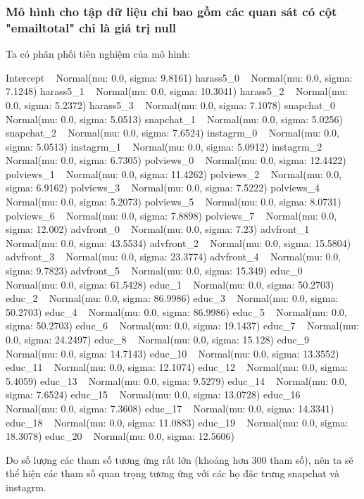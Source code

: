 \subsubsection{Mô hình cho tập dữ liệu chỉ bao gồm các quan sát có cột "emailtotal" chỉ là giá trị null}

Ta có phân phối tiên nghiệm của mô hình:

\begin{python}
Intercept ~ Normal(mu: 0.0, sigma: 9.8161)
harass5_0 ~ Normal(mu: 0.0, sigma: 7.1248)
harass5_1 ~ Normal(mu: 0.0, sigma: 10.3041)
harass5_2 ~ Normal(mu: 0.0, sigma: 5.2372)
harass5_3 ~ Normal(mu: 0.0, sigma: 7.1078)
snapchat_0 ~ Normal(mu: 0.0, sigma: 5.0513)
snapchat_1 ~ Normal(mu: 0.0, sigma: 5.0256)
snapchat_2 ~ Normal(mu: 0.0, sigma: 7.6524)
instagrm_0 ~ Normal(mu: 0.0, sigma: 5.0513)
instagrm_1 ~ Normal(mu: 0.0, sigma: 5.0912)
instagrm_2 ~ Normal(mu: 0.0, sigma: 6.7305)
polviews_0 ~ Normal(mu: 0.0, sigma: 12.4422)
polviews_1 ~ Normal(mu: 0.0, sigma: 11.4262)
polviews_2 ~ Normal(mu: 0.0, sigma: 6.9162)
polviews_3 ~ Normal(mu: 0.0, sigma: 7.5222)
polviews_4 ~ Normal(mu: 0.0, sigma: 5.2073)
polviews_5 ~ Normal(mu: 0.0, sigma: 8.0731)
polviews_6 ~ Normal(mu: 0.0, sigma: 7.8898)
polviews_7 ~ Normal(mu: 0.0, sigma: 12.002)
advfront_0 ~ Normal(mu: 0.0, sigma: 7.23)
advfront_1 ~ Normal(mu: 0.0, sigma: 43.5534)
advfront_2 ~ Normal(mu: 0.0, sigma: 15.5804)
advfront_3 ~ Normal(mu: 0.0, sigma: 23.3774)
advfront_4 ~ Normal(mu: 0.0, sigma: 9.7823)
advfront_5 ~ Normal(mu: 0.0, sigma: 15.349)
educ_0 ~ Normal(mu: 0.0, sigma: 61.5428)
educ_1 ~ Normal(mu: 0.0, sigma: 50.2703)
educ_2 ~ Normal(mu: 0.0, sigma: 86.9986)
educ_3 ~ Normal(mu: 0.0, sigma: 50.2703)
educ_4 ~ Normal(mu: 0.0, sigma: 86.9986)
educ_5 ~ Normal(mu: 0.0, sigma: 50.2703)
educ_6 ~ Normal(mu: 0.0, sigma: 19.1437)
educ_7 ~ Normal(mu: 0.0, sigma: 24.2497)
educ_8 ~ Normal(mu: 0.0, sigma: 15.128)
educ_9 ~ Normal(mu: 0.0, sigma: 14.7143)
educ_10 ~ Normal(mu: 0.0, sigma: 13.3552)
educ_11 ~ Normal(mu: 0.0, sigma: 12.1074)
educ_12 ~ Normal(mu: 0.0, sigma: 5.4059)
educ_13 ~ Normal(mu: 0.0, sigma: 9.5279)
educ_14 ~ Normal(mu: 0.0, sigma: 7.6524)
educ_15 ~ Normal(mu: 0.0, sigma: 13.0728)
educ_16 ~ Normal(mu: 0.0, sigma: 7.3608)
educ_17 ~ Normal(mu: 0.0, sigma: 14.3341)
educ_18 ~ Normal(mu: 0.0, sigma: 11.0883)
educ_19 ~ Normal(mu: 0.0, sigma: 18.3078)
educ_20 ~ Normal(mu: 0.0, sigma: 12.5606)
\end{python}

Do số lượng các tham số tương ứng rất lớn (khoảng hơn 300 tham số), nên ta sẽ thể hiện các tham số quan trọng tương ứng với các họ đặc trưng snapchat và instagrm.


